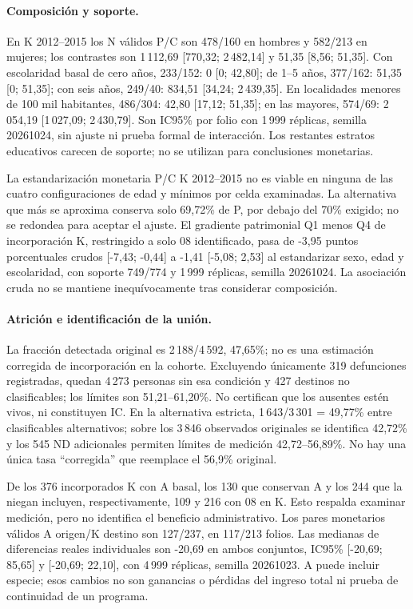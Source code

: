 \paragraph{Composición y soporte.}
En K 2012--2015 los N válidos P/C son 478/160 en hombres y 582/213 en
mujeres; los contrastes son 1\,112{,}69 [770{,}32; 2\,482{,}14] y
51{,}35 [8{,}56; 51{,}35]. Con escolaridad basal de cero años,
233/152: 0 [0; 42{,}80]; de 1--5 años, 377/162: 51{,}35 [0; 51{,}35];
con seis años, 249/40: 834{,}51 [34{,}24; 2\,439{,}35]. En localidades
menores de 100 mil habitantes, 486/304: 42{,}80 [17{,}12; 51{,}35]; en las
mayores, 574/69: 2\,054{,}19 [1\,027{,}09; 2\,430{,}79]. Son IC95\%
por folio con 1\,999 réplicas, semilla 20261024, sin ajuste ni prueba formal
de interacción. Los restantes estratos educativos carecen de soporte; no se
utilizan para conclusiones monetarias.

La estandarización monetaria P/C K 2012--2015 no es viable en ninguna de las
cuatro configuraciones de edad y mínimos por celda examinadas. La alternativa
que más se aproxima conserva solo 69{,}72\% de P, por debajo del 70\%
exigido; no se redondea para aceptar el ajuste. El gradiente patrimonial
Q1 menos Q4 de incorporación K, restringido a solo 08 identificado, pasa de
-3{,}95 puntos porcentuales crudos [-7{,}43; -0{,}44] a -1{,}41
[-5{,}08; 2{,}53] al estandarizar sexo, edad y escolaridad, con soporte
749/774 y 1\,999 réplicas, semilla 20261024. La asociación cruda no se
mantiene inequívocamente tras considerar composición.

\paragraph{Atrición e identificación de la unión.}
La fracción detectada original es 2\,188/4\,592, 47{,}65\%; no es una
estimación corregida de incorporación en la cohorte. Excluyendo únicamente
319 defunciones registradas, quedan 4\,273 personas sin esa condición y 427
destinos no clasificables; los límites son 51{,}21--61{,}20\%. No certifican
que los ausentes estén vivos, ni constituyen IC. En la alternativa estricta,
1\,643/3\,301 = 49{,}77\% entre clasificables alternativos; sobre los
3\,846 observados originales se identifica 42{,}72\% y los 545 ND adicionales
permiten límites de medición 42{,}72--56{,}89\%. No hay una única tasa
``corregida'' que reemplace el 56{,}9\% original.

De los 376 incorporados K con A basal, los 130 que conservan A y los 244 que
la niegan incluyen, respectivamente, 109 y 216 con 08 en K. Esto respalda
examinar medición, pero no identifica el beneficio administrativo. Los pares
monetarios válidos A origen/K destino son 127/237, en 117/213 folios. Las
medianas de diferencias reales individuales son -20{,}69 en ambos conjuntos,
IC95\% [-20{,}69; 85{,}65] y [-20{,}69; 22{,}10], con 4\,999 réplicas,
semilla 20261023. A puede incluir especie; esos cambios no son ganancias o
pérdidas del ingreso total ni prueba de continuidad de un programa.


